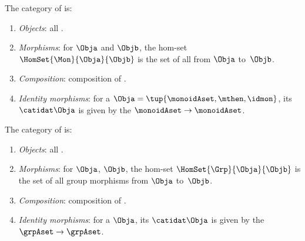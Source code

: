 
\begin{ctdefinition}
    \label{def:Mon}
    The category \Mon of  is:
    \begin{enumerate}
        \item \emph{Objects}: all .
        \item \emph{Morphisms}: for  $\Obja$ and $\Objb$, %
              the hom-set $\HomSet{\Mon}{\Obja}{\Objb}$ is the set of all  from $\Obja$ to~$\Objb$.
        \item \emph{Composition}: composition of .
        \item \emph{Identity morphisms}: for a  $\Obja = \tup{\monoidAset, {{\mthen}}, \idmon}$, its  $\catidat\Obja$ is given by the  $\monoidAset \to \monoidAset$.
    \end{enumerate}
\end{ctdefinition}

\begin{ctdefinition}
    \label{def:Grp}
    The category \Grp of  is:
    \begin{enumerate}
        \item \emph{Objects}: all .
        \item \emph{Morphisms}: for  $\Obja$, $\Objb$, %
              the hom-set $\HomSet{\Grp}{\Obja}{\Objb}$ is the set of all group morphisms from $\Obja$ to~$\Objb$.
        \item \emph{Composition}: composition of .
        \item \emph{Identity morphisms}: for a  $\Obja$, its  $\catidat\Obja$ is given by the  $\grpAset \to \grpAset$.
    \end{enumerate}
\end{ctdefinition}

